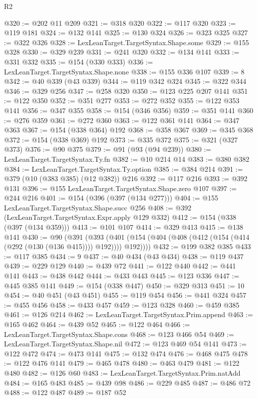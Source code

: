 \begin{lexlean}{R2}
\begin{coremodule}
{{{{{{{{{{{{{{{{{{{{{{{{{{{{{{{{{{{{{{{{{{{{{{{{{{{{{{{{{{{{{{{{{{{{{{{{{{{{{{{{{{{{{{{{{{{{@320 := @202 @11 @209
@321 := @318 @320
@322 := @117 @320
@323 := @119 @181
@324 := @132 @141
@325 := @130 @324
@326 := @323 @325
@327 := @322 @326
@328 := LexLeanTarget.TargetSyntax.Shape.some
@329 := @155 @328
@330 := @329 @239
@331 := @241 @320
@332 := @134 @141
@333 := @331 @332
@335 := @154 (@330 @333)
@336 := LexLeanTarget.TargetSyntax.Shape.none
@338 := @155 @336 @107
@339 := 8
@342 := @40 @339 (@43 @339)
@344 := @119 @342 @324
@345 := @322 @344
@346 := @329 @256
@347 := @258 @320
@350 := @123 @225 @207 @141
@351 := @122 @350
@352 := @351 @277
@353 := @272 @352
@355 := @122 @353 @141
@356 := @347 @355
@358 := @154 (@346 @356)
@359 := @351 @141
@360 := @276 @359
@361 := @272 @360
@363 := @122 @361 @141
@364 := @347 @363
@367 := @154 (@338 @364) @192
@368 := @358 @367
@369 := @345 @368
@372 := @154 (@338 @369) @192
@373 := @335 @372
@375 := @321 (@327 @373)
@376 := @90 @375
@379 := @91 (@93 (@94 @239))
@380 := LexLeanTarget.TargetSyntax.Ty.fn
@382 := @10 @214 @14
@383 := @380 @382
@384 := LexLeanTarget.TargetSyntax.Ty.option
@385 := @384 @214
@391 := @379 (@10 (@383 @385) (@12 @382)) @216
@392 := @117 @216
@393 := @392 @131
@396 := @155 LexLeanTarget.TargetSyntax.Shape.zero @107
@397 := @244 @216
@401 := @154 (@396 (@397 (@134 @277)))
@404 := @155 LexLeanTarget.TargetSyntax.Shape.succ @256
@408 := @392 (LexLeanTarget.TargetSyntax.Expr.apply @129 @332)
@412 := @154 (@338 (@397 (@134 @359)))
@413 := @101 @107
@414 := @329 @413
@415 := @138 @141
@430 := @90
    (@391
      (@393 (@401 (@154 (@404 (@408 (@412 (@154 (@414 (@292 (@130 (@136 @415)))) @192)))) @192))))
@432 := @199 @382 @385
@433 := @117 @385
@434 := 9
@437 := @40 @434 (@43 @434)
@438 := @119 @437
@439 := @229 @129
@440 := @439 @72
@441 := @122 @440
@442 := @441 @141
@443 := @438 @442
@444 := @433 @443
@445 := @123 @336
@447 := @445 @385 @141
@449 := @154 (@338 @447)
@450 := @329 @313
@451 := 10
@454 := @40 @451 (@43 @451)
@455 := @119 @454
@456 := @441 @324
@457 := @455 @456
@458 := @433 @457
@459 := @123 @328
@460 := @459 @385
@461 := @126 @214
@462 := LexLeanTarget.TargetSyntax.Prim.append
@463 := @165 @462
@464 := @439 @52
@465 := @122 @464
@466 := LexLeanTarget.TargetSyntax.Shape.cons
@468 := @123 @466 @54
@469 := LexLeanTarget.TargetSyntax.Shape.nil
@472 := @123 @469 @54 @141
@473 := @122 @472
@474 := @473 @141
@475 := @132 @474
@476 := @468 @475
@478 := @122 @476 @141
@479 := @465 @478
@480 := @463 @479
@481 := @122 @480
@482 := @126 @60
@483 := LexLeanTarget.TargetSyntax.Prim.natAdd
@484 := @165 @483
@485 := @439 @98
@486 := @229 @485
@487 := @486 @72
@488 := @122 @487
@489 := @187 @52
}}}}}}}}}}}}}}}}}}}}}}}}}}}}}}}}}}}}}}}}}}}}}}}}}}}}}}}}}}}}}}}}}}}}}}}}}}}}}}}}}}}}}}}}}}}}
\end{coremodule}
\end{lexlean}
